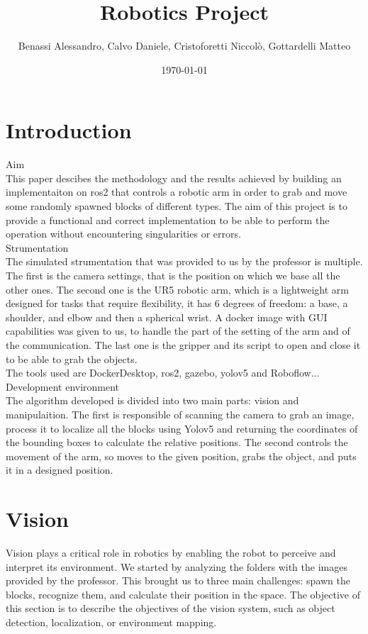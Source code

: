 \documentclass[12pt,a4paper]{article}
\title{Robotics Project}
\author{Benassi Alessandro, Calvo Daniele, Cristoforetti Niccolò, Gottardelli Matteo}
\date{\today}
\begin{document}
\maketitle
\tableofcontents
\newpage

\section{Introduction}\label{sec:intro}
Aim\\
This paper descibes the methodology and the results achieved by building an implementaiton on ros2 that controls a robotic arm in order to grab and move some randomly spawned blocks of different types. The aim of this project is to provide a functional and correct implementation to be able to perform the operation without encountering singularities or errors.\\
Strumentation\\
The simulated strumentation that was provided to us by the professor is multiple. The first is the camera settings, that is the position on which we base all the other ones. The second one is the UR5 robotic arm, which is a lightweight arm designed for tasks that require flexibility, it has 6 degrees of freedom: a base, a shoulder, and elbow and then a spherical wrist. A docker image with GUI capabilities was given to us, to handle the part of the setting of the arm and of the communication. The last one is the gripper and its script to open and close it to be able to grab the objects.\\
The tools used are DockerDesktop, ros2, gazebo, yolov5 and Roboflow...\\
Development environment\\
The algorithm developed is divided into two main parts: vision and manipulaition. The first is responsible of scanning the camera to grab an image, process it to localize all the blocks using Yolov5 and returning the coordinates of the bounding boxes to calculate the relative positions. The second controls the movement of the arm, so moves to the given position, grabs the object, and puts it in a designed position.


\section{Vision}\label{sec:vision}
Vision plays a critical role in robotics by enabling the robot to perceive and interpret its environment. 
We started by analyzing the folders with the images provided by the professor. This brought us to three main challenges: spawn the blocks, recognize them, and calculate their position in the space. 
The objective of this section is to describe the objectives of the vision system, such as object detection, localization, or environment mapping.
\end{document}
